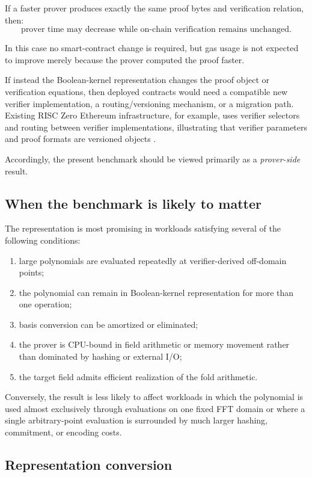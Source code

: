 If a faster prover produces exactly the same proof bytes and verification
relation, then:
\[
\boxed{
\text{prover time may decrease while on-chain verification remains unchanged}.
}
\]

In this case no smart-contract change is required, but gas usage is not
expected to improve merely because the prover computed the proof faster.

If instead the Boolean-kernel representation changes the proof object or
verification equations, then deployed contracts would need a compatible new
verifier implementation, a routing/versioning mechanism, or a migration
path.  Existing RISC Zero Ethereum infrastructure, for example, uses
verifier selectors and routing between verifier implementations, illustrating
that verifier parameters and proof formats are versioned objects
\cite{risc0router}.

Accordingly, the present benchmark should be viewed primarily as a
\emph{prover-side} result.

\subsection{When the benchmark is likely to matter}

The representation is most promising in workloads satisfying several of
the following conditions:

\begin{enumerate}
    \item large polynomials are evaluated repeatedly at verifier-derived
    off-domain points;
    \item the polynomial can remain in Boolean-kernel representation for
    more than one operation;
    \item basis conversion can be amortized or eliminated;
    \item the prover is CPU-bound in field arithmetic or memory movement
    rather than dominated by hashing or external I/O;
    \item the target field admits efficient realization of the fold
    arithmetic.
\end{enumerate}

Conversely, the result is less likely to affect workloads in which the
polynomial is used almost exclusively through evaluations on one fixed FFT
domain or where a single arbitrary-point evaluation is surrounded by much
larger hashing, commitment, or encoding costs.

\subsection{Representation conversion}

